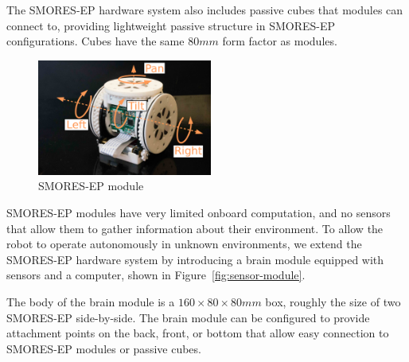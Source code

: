 \documentclass[conference]{IEEEtran}
\begin{document}
The SMORES-EP hardware system also includes passive cubes that modules can connect to, providing lightweight passive structure in SMORES-EP configurations.  Cubes have the same $80mm$ form factor as modules.
%
\begin{figure}   
\begin{center}
\includegraphics[height=1.5in]{images/smores_dof.pdf}
\end{center}
\caption{SMORES-EP module}
\label{fig:smores-module}
\vspace{-2em}
\end{figure}
%

\label{sec:sensor_module}
%
SMORES-EP modules have very limited onboard computation, and no sensors that allow them to gather information about their environment.  To allow the robot to operate autonomously in unknown environments, we extend the SMORES-EP hardware system by introducing a brain module equipped with sensors and a computer, shown in Figure~\ref{fig:sensor-module}.

The body of the brain module is a $160\times80\times80mm$ box, roughly the size of two SMORES-EP side-by-side.  The brain module can be configured to provide attachment points on the back, front, or bottom that allow easy connection to SMORES-EP modules or passive cubes.
\end{document}
